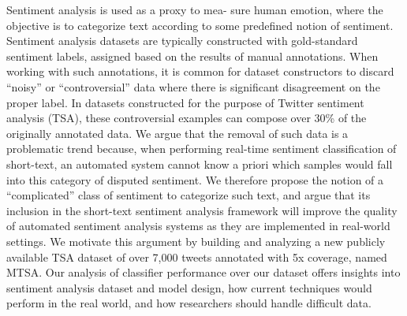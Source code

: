 Sentiment analysis is used as a proxy to mea- sure human emotion, where the objective is to categorize text according to some predefined notion of sentiment. Sentiment analysis datasets are typically constructed with gold-standard sentiment labels, assigned based on the results of manual annotations. When working with such annotations, it is common for dataset constructors to discard ``noisy'' or ``controversial'' data where there is significant disagreement on the proper label. In datasets constructed for the purpose of Twitter sentiment analysis (TSA), these controversial examples can compose over 30\% of the originally annotated data. We argue that the removal of such data is a problematic trend because, when performing real-time sentiment classification of short-text, an automated system cannot know a priori which samples would fall into this category of disputed sentiment. We therefore propose the notion of a ``complicated'' class of sentiment to categorize such text, and argue that its inclusion in the short-text sentiment analysis framework will improve the quality of automated sentiment analysis systems as they are implemented in real-world settings. We motivate this argument by building and analyzing a new publicly available TSA dataset of over 7,000 tweets annotated with 5x coverage, named MTSA. Our analysis of classifier performance over our dataset offers insights into sentiment analysis dataset and model design, how current techniques would perform in the real world, and how researchers should handle difficult data.
